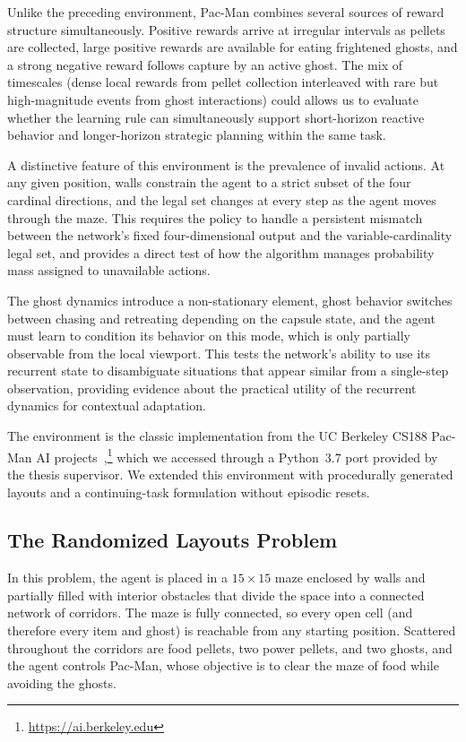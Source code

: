 Unlike the preceding environment, Pac-Man combines several sources of reward
structure simultaneously. Positive rewards arrive at irregular intervals as pellets are
collected, large positive rewards are available for eating frightened ghosts, and a strong
negative reward follows capture by an active ghost. The mix of timescales (dense local
rewards from pellet collection interleaved with rare but high-magnitude events from ghost
interactions) could allows us to evaluate whether the learning rule can simultaneously support
short-horizon reactive behavior and longer-horizon strategic planning within the same
task.

A distinctive feature of this environment is the prevalence of invalid actions. At any
given position, walls constrain the agent to a strict subset of the four cardinal directions,
and the legal set changes at every step as the agent moves through the maze. This
requires the policy to handle a persistent mismatch between the network's fixed
four-dimensional output and the variable-cardinality legal set, and provides a direct test
of how the algorithm manages probability mass assigned to unavailable actions. 

The ghost dynamics introduce a non-stationary element, ghost behavior switches between
chasing and retreating depending on the capsule state, and the agent must learn to
condition its behavior on this mode, which is only partially observable from the local
viewport. This tests the network's ability to use its recurrent state to disambiguate
situations that appear similar from a single-step observation, providing evidence about
the practical utility of the recurrent dynamics for contextual adaptation.

The environment is the classic implementation from the UC Berkeley
CS188 Pac-Man AI projects~\citep{denero2010pacman},\footnote{\url{https://ai.berkeley.edu}}
which we accessed through a Python~3.7 port provided by the thesis supervisor.
We extended this environment with procedurally generated layouts and a
continuing-task formulation without episodic resets.

\subsection{The Randomized Layouts Problem}

In this problem, the agent is placed in a $15 \times 15$ maze enclosed by walls and partially filled with interior obstacles that divide the space into a connected network of corridors. The maze is fully connected, so every open cell (and therefore every item and ghost) is reachable from any starting position. Scattered throughout the corridors are food pellets, two power pellets, and two ghosts, and the agent controls Pac-Man, whose objective is to clear the maze of food while avoiding the ghosts.

